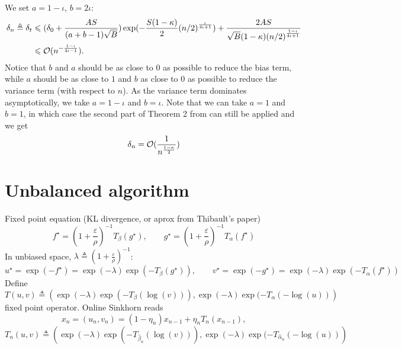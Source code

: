 \documentclass[a4paper, 10pt]{article}
\begin{document}
We set $a = 1 - \iota$, $ b = 2 \iota$:
\begin{align}
    \delta_n \triangleq \delta_t &\leqslant 
    (\delta_0 + \frac{A S}{(a + b - 1)\sqrt{B}})
    \exp(- \frac{S(1 - \kappa)}{2} {(n/2)}^{\frac{\iota}{4\iota+1}})
    + \frac{2 A S}{\sqrt{B}(1 - \kappa) {(n/2)}^{\frac{1 - \iota}{4\iota+1}}} \\
    &\leqslant \mathcal{O}(n^{-\frac{1 - \iota}{4 \iota - 1}}).
\end{align}
Notice that $b$ and $a$ should be as close to $0$ as possible to reduce the bias term, while $a$
should be as close to $1$ and $b$ as close to $0$ as possible to reduce the variance
term (with respect to $n$). As the variance term dominates asymptotically, we take $a=1 - \iota$ and
$b = \iota$. Note that we can take $a = 1$ and $b = 1$, in which case the second part of Theorem 2 from \citet{moulines_non-asymptotic_2011} can still be applied and we get
\begin{equation}
    \delta_n = \mathcal{O}(\frac{1}{n^{\frac{1 - \kappa}{2}}})
\end{equation}

\section{Unbalanced algorithm}

Fixed point equation (KL divergence, or aprox from Thibault's paper)
\begin{equation}
    f^\star = \left( 1 + \frac{\varepsilon}{\rho} \right)^{-1} T_\beta ( g^\star), \qquad
    g^\star = \left( 1 + \frac{\varepsilon}{\rho} \right)^{-1} T_\alpha ( f^\star)
\end{equation}
In unbiased space, $\lambda \triangleq \left( 1 + \frac{\varepsilon}{\rho} \right)^{-1}$:
\begin{equation}
    u^\star = \exp(-f^\star) = \exp(-\lambda) \exp(-T_\beta ( g^\star)), \qquad
    v^\star = \exp(-g^\star) = \exp(-\lambda) \exp(-T_\alpha ( f^\star))
\end{equation}
Define
\begin{equation}
    T(u, v) \triangleq \left(\exp(-\lambda) \exp(-T_\beta (\log(v))),
                    \exp(-\lambda) \exp(-T_\alpha (-\log(u)) \right)
\end{equation}
fixed point operator. Online Sinkhorn reads
\begin{equation}
    x_n = (u_n, v_n) = (1 - \eta_n) x_{n-1} + \eta_n T_n(x_{n-1}),
\end{equation}
\begin{equation}
    T_n(u, v) \triangleq \left(\exp(-\lambda) \exp(-T_{\hat \beta_n} (\log(v))),
                    \exp(-\lambda) \exp(-T_{\hat \alpha_n} (-\log(u)) \right)
\end{equation}

\printbibliography
\end{document}
